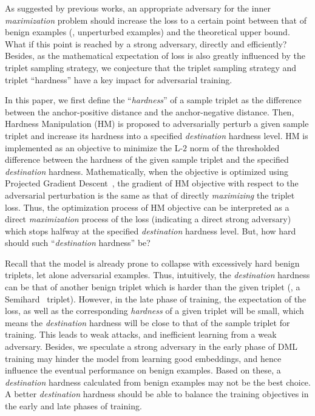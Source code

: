 \documentclass[10pt,twocolumn,letterpaper]{article}
\begin{document}

As suggested by previous works, an appropriate adversary for the inner
\emph{maximization} problem should increase the loss to a certain point between
that of benign examples (\ie, unperturbed examples) and the theoretical upper
bound.
%
What if this point is reached by a strong adversary, directly and
efficiently?
%
Besides, as the mathematical expectation of loss is also greatly influenced by
the triplet sampling strategy, we conjecture that the triplet sampling strategy
and triplet ``hardness'' have a key impact for adversarial training.


In this paper, we first define the ``\emph{hardness}'' of a sample triplet as
the difference between the anchor-positive distance and the anchor-negative
distance.
%
Then, Hardness Manipulation (HM) is proposed to adversarially perturb a given
sample triplet and increase its hardness into a specified \emph{destination}
hardness level.
%
HM is implemented as an objective to minimize the L-$2$ norm of the thresholded
difference between the hardness of the given sample triplet and the specified
\emph{destination} hardness.
%
Mathematically, when the objective is optimized using Projected Gradient
Descent~\cite{madry}, the gradient of HM objective with respect to the
adversarial perturbation is the same as that of directly \emph{maximizing} the
triplet loss.
%
Thus, the optimization process of HM objective can be interpreted as a direct
\emph{maximization} process of the loss (indicating a direct strong adversary)
which stops halfway at the specified \emph{destination} hardness level.
%
But, how hard should such ``\emph{destination} hardness'' be?


Recall that the model is already prone to collapse with excessively hard benign
triplets, let alone adversarial examples.
%
Thus, intuitively, the \emph{destination} hardness can be that of another
benign triplet which is harder than the given triplet (\eg, a
Semihard~\cite{facenet} triplet).
%
However, in the late phase of training, the expectation of the loss, as well as
the corresponding \emph{hardness} of a given triplet will be small, which means
the \emph{destination} hardness will be close to that of the sample triplet for
training.
%
This leads to weak attacks, and inefficient learning from a weak adversary.
%
Besides, we speculate a strong adversary in the early phase of DML training may
hinder the model from learning good embeddings, and hence influence the
eventual performance on benign examples.
%
Based on these, a \emph{destination} hardness calculated from benign examples
may not be the best choice.
%
A better \emph{destination} hardness should be able to balance the training
objectives in the early and late phases of training.
\end{document}

